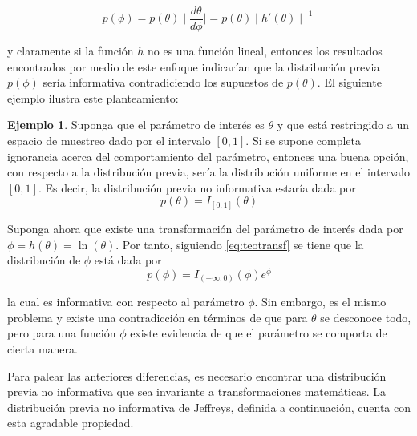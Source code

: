 \documentclass[
  10pt,
  spanish,
]{book}
\theoremstyle{definition}
\theoremstyle{definition}
\newtheorem{example}{Ejemplo}[chapter]
\theoremstyle{definition}
\theoremstyle{definition}
\theoremstyle{remark}
\begin{document}
\begin{equation}
\label{eq:teotransf}
p(\phi)=p(\theta) \mid \frac{d\theta}{d\phi} \mid =p(\theta) \mid h'(\theta) \mid ^{-1}
\end{equation}

y claramente si la función \(h\) no es una función lineal, entonces los
resultados encontrados por medio de este enfoque indicarían que la
distribución previa \(p(\phi)\) sería informativa contradiciendo
los supuestos de \(p(\theta)\). El siguiente ejemplo ilustra este
planteamiento:

\begin{example}
\protect\hypertarget{exm:unnamed-chunk-15}{}{\label{exm:unnamed-chunk-15} }Suponga que el parámetro de interés es \(\theta\) y que está restringido a un espacio de muestreo dado por el intervalo \([0,1]\). Si se supone completa ignorancia acerca del comportamiento del parámetro, entonces una buena opción, con respecto a la distribución previa, sería la distribución uniforme en el intervalo \([0,1]\). Es decir, la distribución previa no informativa estaría dada por
\begin{equation*}
p(\theta) = I_{[0,1]}(\theta)
\end{equation*}

Suponga ahora que existe una transformación del parámetro de interés dada por \(\phi=h(\theta)=\ln(\theta)\). Por tanto, siguiendo \eqref{eq:teotransf} se tiene que la distribución de \(\phi\) está dada por
\begin{equation*}
p(\phi)=I_{(-\infty,0)}(\phi)e^{\phi}
\end{equation*}

la cual es informativa con respecto al parámetro \(\phi\). Sin embargo, es el mismo problema y existe una contradicción en términos de que para \(\theta\) se desconoce todo, pero para una función \(\phi\) existe evidencia de que el parámetro se comporta de cierta manera.
\end{example}

Para palear las anteriores diferencias, es necesario encontrar una
distribución previa no informativa que sea invariante a
transformaciones matemáticas. La distribución previa no
informativa de Jeffreys, definida a continuación, cuenta con esta
agradable propiedad.
\end{document}
